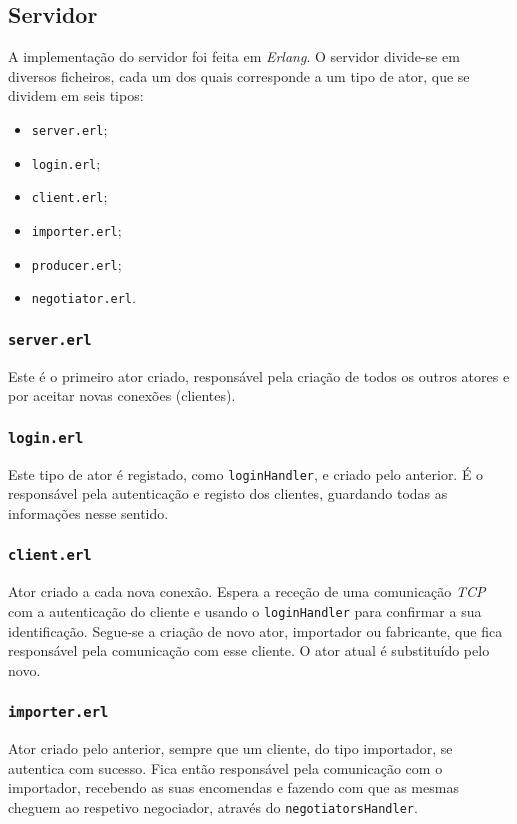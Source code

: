 \documentclass[a4paper]{report}
\begin{document}
	\subsection{Servidor}
	A implementação do servidor foi feita em \textit{Erlang}. O servidor divide-se em diversos ficheiros, cada um dos quais corresponde a um tipo de ator, que se dividem em seis tipos:
	\begin{itemize}
		\item \texttt{server.erl};
		\item \texttt{login.erl};
		\item \texttt{client.erl};
		\item \texttt{importer.erl};
		\item \texttt{producer.erl};
		\item \texttt{negotiator.erl}.
	\end{itemize}

	\subsubsection{\texttt{server.erl}}
	Este é o primeiro ator criado, responsável pela criação de todos os outros atores e por aceitar novas conexões (clientes).

	\subsubsection{\texttt{login.erl}}
	Este tipo de ator é registado, como \texttt{loginHandler}, e criado pelo anterior. É o responsável pela autenticação e registo dos clientes, guardando todas as informações nesse sentido.

	\subsubsection{\texttt{client.erl}}
	Ator criado a cada nova conexão. Espera a receção de uma comunicação \textit{TCP} com a autenticação do cliente e usando o \texttt{loginHandler} para confirmar a sua identificação.
	Segue-se a criação de novo ator, importador ou fabricante, que fica responsável pela comunicação com esse cliente. O ator atual é substituído pelo novo.

	\subsubsection{\texttt{importer.erl}}
	Ator criado pelo anterior, sempre que um cliente, do tipo importador, se autentica com sucesso. 
	Fica então responsável pela comunicação com o importador, recebendo as suas encomendas e fazendo com que as mesmas cheguem ao respetivo negociador, através do \texttt{negotiatorsHandler}.
\end{document}
